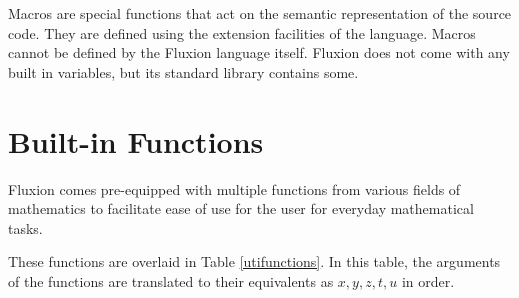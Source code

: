 \documentclass[11pt,a4paper]{book}
\begin{document}
Macros are special functions that act on the semantic representation of the source code. They are defined using the extension facilities of the language. Macros cannot be defined by the Fluxion language itself. Fluxion does not come with any built in variables, but its standard library contains some.

\section{Built-in Functions}

Fluxion comes pre-equipped with multiple functions from various fields of mathematics to facilitate ease of use for the user for everyday mathematical tasks.

These functions are overlaid in Table \ref{utifunctions}. In this table, the arguments of the functions are translated to their equivalents as $x, y, z, t, u$ in order.
\end{document}
